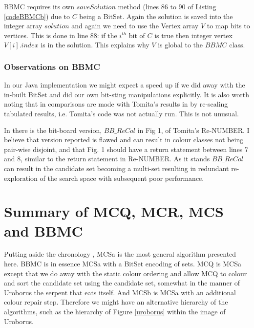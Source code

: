 \documentclass{l4proj}
\begin{document}
BBMC requires its own $saveSolution$ method (lines 86 to 90 of Listing \ref{codeBBMCb}) due to $C$ being a BitSet. Again the
solution is saved into the integer array $solution$ and again we need to use the Vertex array $V$ to map bits to vertices.
This is done in line 88: if the $i^{th}$ bit of $C$ is true then integer vertex $V[i].index$ is in the solution. This explains
why $V$ is global to the $BBMC$ class.

\begin{figure}

\end{figure}

\subsubsection{Observations on BBMC}
In our Java implementation we might expect a speed up if
we did away with the in-built BitSet and did our own bit-sting manipulations explicitly. 
It is also worth noting that in \cite{segundo2011b} comparisons are made with Tomita's results in \cite{tomita2010}
by re-scaling tabulated results, i.e. Tomita's code was not actually run. This is not unusual.

In \cite{segundo2011b} there is the bit-board version, $BB\_ReCol$ in Fig 1, of Tomita's Re-NUMBER.
I believe that version reported is flawed and can result in colour classes not being pair-wise disjoint, and that Fig. 1 should have a return
statement between lines 7 and 8, similar to the return statement in Re-NUMBER. As it stands
$BB\_ReCol$ can result in the candidate set becoming a multi-set resulting in redundant re-exploration of the search space with subsequent
poor performance. 


%
\section{Summary of MCQ, MCR, MCS and BBMC}
\label{sec:algSummary}
Putting aside the chronology \cite{tomita2003,tomita2007,tomita2010,segundo2011}, MCSa is the most general algorithm presented here. 
BBMC is in essence MCSa with a BitSet encoding of sets.
MCQ is MCSa except that we do away with the static colour ordering and allow MCQ to colour and sort the candidate set
using the candidate set, somewhat in the manner of Uroborus the serpent that eats itself. And MCSb is 
MCSa with an additional colour repair step. Therefore we might have an alternative hierarchy of the algorithms, such as the 
hierarchy of Figure \ref{uroborus} within the image of Uroborus.
\end{document}
